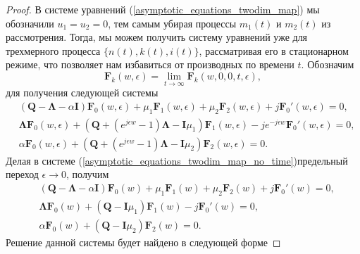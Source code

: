 \begin{proof}
	В системе уравнений (\ref{asymptotic_equations_twodim_map}) мы обозначили $u_{1} = u_{2} = 0$, тем самым убирая процессы $m_{1}(t)$ и $m_{2}(t)$ из рассмотрения. Тогда, мы можем получить систему уравнений уже для трехмерного процесса $\{n(t),k(t),i(t)\}$, рассматривая его в стационарном режиме, что позволяет нам избавиться от производных по времени $t$.
	Обозначим 
	\begin{equation*}
		\boldsymbol{F}_{k}(w,\epsilon) = \lim_{t \xrightarrow{} \infty} \boldsymbol{F}_{k}(w,0,0,t,\epsilon),
	\end{equation*}
для получения следующей системы
\begin{equation}
		 \label{asymptotic_equations_twodim_map_no_time}
		 \begin{split}
		 &(\boldsymbol{Q}-\boldsymbol{\Lambda}-\alpha\boldsymbol{I})\boldsymbol{F}_{0}(w,\epsilon) + \mu_{1} \boldsymbol{F}_{1}(w,\epsilon)  +  \mu_{2}\boldsymbol{F}_{2}(w,\epsilon) + j
		 \boldsymbol{F}_{0}'(w,\epsilon)  = 0,
		\\
		 &\boldsymbol{\Lambda} \boldsymbol{F}_{0}(w,\epsilon) +  (\boldsymbol{Q}+(e^{j\epsilon w}-1)\boldsymbol{\Lambda} - \boldsymbol{I}\mu_{1})\boldsymbol{F}_{1}(w,\epsilon) - j e^{-j\epsilon w}
		 \boldsymbol{F}_{0}'(w,\epsilon)  = 0,
		\\
		&\alpha \boldsymbol{F}_{0}(w,\epsilon) + (\boldsymbol{Q}+(e^{j\epsilon w}-1)\boldsymbol{\Lambda} - \boldsymbol{I}\mu_{2})\boldsymbol{F}_{2}(w,\epsilon)  = 0.
	\end{split}
\end{equation}  
Делая в системе (\ref{asymptotic_equations_twodim_map_no_time})предельный переход $\epsilon \xrightarrow{} 0$, получим
\begin{equation}
	\label{asymptotic_equations_twodim_map_no_limit}
	\begin{split}
		&(\boldsymbol{Q}-\boldsymbol{\Lambda}-\alpha\boldsymbol{I})\boldsymbol{F}_{0}(w) + \mu_{1} \boldsymbol{F}_{1}(w)  +  \mu_{2}\boldsymbol{F}_{2}(w) + j
		\boldsymbol{F}_{0}'(w)  = 0,
		\\
		&\boldsymbol{\Lambda} \boldsymbol{F}_{0}(w) +  (\boldsymbol{Q} - \boldsymbol{I}\mu_{1})\boldsymbol{F}_{1}(w) - j
		\boldsymbol{F}_{0}'(w)  = 0,
		\\
		&\alpha \boldsymbol{F}_{0}(w) + (\boldsymbol{Q} - \boldsymbol{I}\mu_{2})\boldsymbol{F}_{2}(w)  = 0.
	\end{split}
\end{equation}
Решение данной системы будет найдено в следующей форме

\end{proof}
